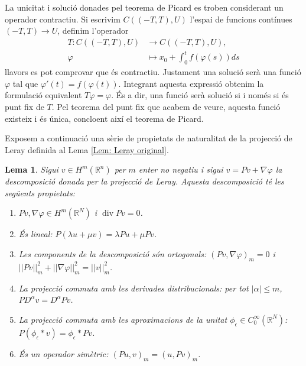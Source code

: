 \documentclass{article}
\numberwithin{equation}{section}
\DeclareMathOperator{\diver}{div}
\newtheorem{lema}{Lema}[section]
\begin{document}
La unicitat i soluci\'{o} donades pel teorema de Picard es troben considerant un operador contractiu. Si escrivim $C((-T,T),U)$ l'espai de funcions cont\'{i}nues $(-T,T)\rightarrow U$, definim l'operador
\begin{equation}
\begin{split}
T:C((-T,T),U)&\longrightarrow C((-T,T),U),\\
\varphi&\longmapsto x_0+\int_0^tf(\varphi(s))ds
\end{split}
\end{equation}
llavors es pot comprovar que \'{e}s contractiu. Justament una soluci\'{o} ser\`{a} una funci\'{o} $\varphi$ tal que $\varphi'(t)=f(\varphi(t))$. Integrant aquesta expressi\'{o} obtenim la formulaci\'{o} equivalent $T\varphi=\varphi$. \'{E}s a dir, una funci\'{o} ser\`{a} soluci\'{o} si i nom\'{e}s si \'{e}s punt fix de $T$. Pel teorema del punt fix que acabem de veure, aquesta funci\'{o} existeix i \'{e}s \'{u}nica, concloent aix\'{i} el teorema de Picard.
\vspace{3mm}

Exposem a continuaci\'{o} una s\`{e}rie de propietats de naturalitat de la projecci\'{o} de Leray definida al Lema \ref{Lem: Leray original}.

\begin{lema}
Sigui $v\in H^m(\mathbb{R}^n)$ per $m$ enter no negatiu i sigui $v=Pv+\nabla\varphi$ la descomposici\'{o} donada per la projecci\'{o} de Leray. Aquesta descomposici\'{o} t\'{e} les seg\"{u}ents propietats:
\begin{enumerate}
\item $Pv,\nabla\varphi\in H^m(\mathbb{R}^N)$ i $\diver Pv=0$.
\item \'{E}s lineal: $P(\lambda u+\mu v)=\lambda Pu+\mu Pv$.
\item Les components de la descomposici\'{o} s\'{o}n ortogonals: $(Pv,\nabla\varphi)_m=0$ i $||Pv||_m^2+||\nabla\varphi||_m^2=||v||_m^2$.
\item La projecci\'{o} commuta amb les derivades distribucionals: per tot $|\alpha|\leq m$, $PD^{\alpha}v=D^{\alpha}Pv$.
\item La projecci\'{o} commuta amb les aproximacions de la unitat $\phi_{\epsilon}\in C_0^{\infty}(\mathbb{R}^N)$: $P(\phi_{\epsilon}*v)=\phi_{\epsilon}*Pv$.
\item \'{E}s un operador sim\`{e}tric: $(Pu,v)_m=(u,Pv)_m$.
\end{enumerate}
\end{lema}
\end{document}
